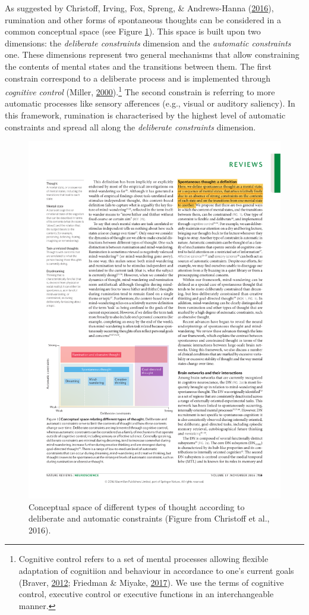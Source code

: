 \documentclass[a4paper,12pt,twoside,openright,oldfontcommands]{memoir}
\let\rmarkdownfootnote\footnote%
\def\footnote{\protect\rmarkdownfootnote}
\begin{document}
As suggested by Christoff, Irving, Fox, Spreng, \& Andrews-Hanna (\protect\hyperlink{ref-christoff_mind-wandering_2016}{2016}), rumination and other forms of spontaneous thoughts can be considered in a common conceptual space (see Figure \ref{fig:conceptual}). This space is built upon two dimensions: the \emph{deliberate constraints} dimension and the \emph{automatic constraints} one. These dimensions represent two general mechanisms that allow constraining the contents of mental states and the transitions between them. The first constrain correspond to a deliberate process and is implemented through \emph{cognitive control} (Miller, \protect\hyperlink{ref-miller_prefontral_2000}{2000}).\footnote{Cognitive control refers to a set of mental processes allowing flexible adaptation of cognitiion and behaviour in accordance to one's current goals (Braver, \protect\hyperlink{ref-braver_variable_2012}{2012}; Friedman \& Miyake, \protect\hyperlink{ref-friedman_unity_2017}{2017}). We use the terms of cognitive control, executive control or executive functions in an interchangeable manner.} The second constrain is referring to more automatic processes like sensory afferences (e.g., visual or auditory saliency). In this framework, rumination is characterised by the highest level of automatic constraints and spread all along the \emph{deliberate constraints} dimension.

\begin{figure}

{\centering \includegraphics[width=0.75\linewidth]{assets/conceptual_space} 

}

\caption{Conceptual space of different types of thought according to deliberate and automatic constraints (Figure from Christoff et al., 2016).}\label{fig:conceptual}
\end{figure}
\end{document}
